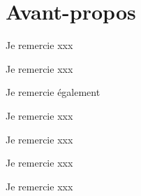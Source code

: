 \chapter*{Avant-propos}

Je remercie xxx \lipsum[66]

\bigskip

Je remercie xxx \lipsum[66]

\bigskip

Je remercie également \lipsum[66]

\bigskip

Je remercie xxx \lipsum[66]

\bigskip

Je remercie xxx \lipsum[66]

\bigskip

Je remercie xxx \lipsum[66]

\bigskip

Je remercie xxx \lipsum[66]


\newpage
\thispagestyle{empty}
\mbox{}
\newpage